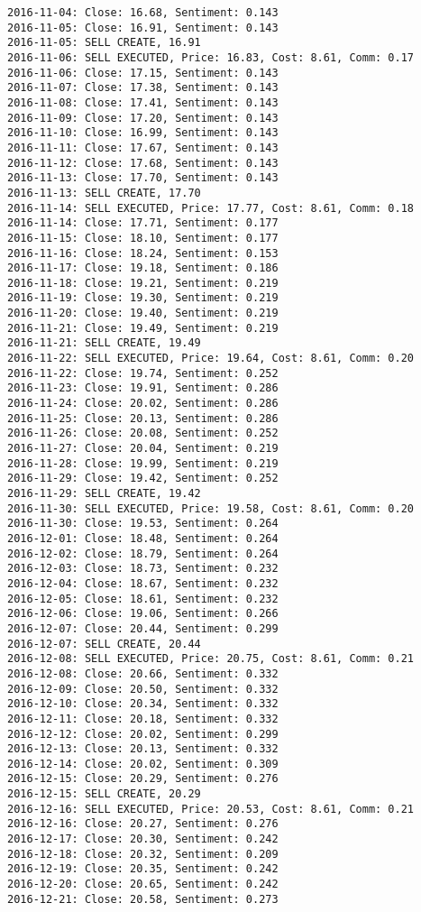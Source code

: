 \documentclass[11pt]{article}
\begin{document}
\begin{Verbatim}[commandchars=\\\{\}]
2016-11-04: Close: 16.68, Sentiment: 0.143
2016-11-05: Close: 16.91, Sentiment: 0.143
2016-11-05: SELL CREATE, 16.91
2016-11-06: SELL EXECUTED, Price: 16.83, Cost: 8.61, Comm: 0.17
2016-11-06: Close: 17.15, Sentiment: 0.143
2016-11-07: Close: 17.38, Sentiment: 0.143
2016-11-08: Close: 17.41, Sentiment: 0.143
2016-11-09: Close: 17.20, Sentiment: 0.143
2016-11-10: Close: 16.99, Sentiment: 0.143
2016-11-11: Close: 17.67, Sentiment: 0.143
2016-11-12: Close: 17.68, Sentiment: 0.143
2016-11-13: Close: 17.70, Sentiment: 0.143
2016-11-13: SELL CREATE, 17.70
2016-11-14: SELL EXECUTED, Price: 17.77, Cost: 8.61, Comm: 0.18
2016-11-14: Close: 17.71, Sentiment: 0.177
2016-11-15: Close: 18.10, Sentiment: 0.177
2016-11-16: Close: 18.24, Sentiment: 0.153
2016-11-17: Close: 19.18, Sentiment: 0.186
2016-11-18: Close: 19.21, Sentiment: 0.219
2016-11-19: Close: 19.30, Sentiment: 0.219
2016-11-20: Close: 19.40, Sentiment: 0.219
2016-11-21: Close: 19.49, Sentiment: 0.219
2016-11-21: SELL CREATE, 19.49
2016-11-22: SELL EXECUTED, Price: 19.64, Cost: 8.61, Comm: 0.20
2016-11-22: Close: 19.74, Sentiment: 0.252
2016-11-23: Close: 19.91, Sentiment: 0.286
2016-11-24: Close: 20.02, Sentiment: 0.286
2016-11-25: Close: 20.13, Sentiment: 0.286
2016-11-26: Close: 20.08, Sentiment: 0.252
2016-11-27: Close: 20.04, Sentiment: 0.219
2016-11-28: Close: 19.99, Sentiment: 0.219
2016-11-29: Close: 19.42, Sentiment: 0.252
2016-11-29: SELL CREATE, 19.42
2016-11-30: SELL EXECUTED, Price: 19.58, Cost: 8.61, Comm: 0.20
2016-11-30: Close: 19.53, Sentiment: 0.264
2016-12-01: Close: 18.48, Sentiment: 0.264
2016-12-02: Close: 18.79, Sentiment: 0.264
2016-12-03: Close: 18.73, Sentiment: 0.232
2016-12-04: Close: 18.67, Sentiment: 0.232
2016-12-05: Close: 18.61, Sentiment: 0.232
2016-12-06: Close: 19.06, Sentiment: 0.266
2016-12-07: Close: 20.44, Sentiment: 0.299
2016-12-07: SELL CREATE, 20.44
2016-12-08: SELL EXECUTED, Price: 20.75, Cost: 8.61, Comm: 0.21
2016-12-08: Close: 20.66, Sentiment: 0.332
2016-12-09: Close: 20.50, Sentiment: 0.332
2016-12-10: Close: 20.34, Sentiment: 0.332
2016-12-11: Close: 20.18, Sentiment: 0.332
2016-12-12: Close: 20.02, Sentiment: 0.299
2016-12-13: Close: 20.13, Sentiment: 0.332
2016-12-14: Close: 20.02, Sentiment: 0.309
2016-12-15: Close: 20.29, Sentiment: 0.276
2016-12-15: SELL CREATE, 20.29
2016-12-16: SELL EXECUTED, Price: 20.53, Cost: 8.61, Comm: 0.21
2016-12-16: Close: 20.27, Sentiment: 0.276
2016-12-17: Close: 20.30, Sentiment: 0.242
2016-12-18: Close: 20.32, Sentiment: 0.209
2016-12-19: Close: 20.35, Sentiment: 0.242
2016-12-20: Close: 20.65, Sentiment: 0.242
2016-12-21: Close: 20.58, Sentiment: 0.273

\end{Verbatim}
\end{document}
